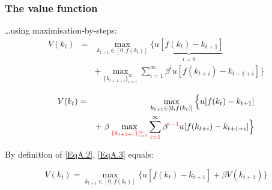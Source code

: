 \documentclass[10pt, handout]{beamer}
\begin{document}
\begin{frame}

\frametitle{The value function}

\ldots using maximisation-by-steps:
 \begin{eqnarray} \nonumber
V(k_t) & = & \max_{ k_{t+1} \in [0,f(k_t)] } \Big\{ \underset{ i = 0}{\underbrace{u[f(k_{t})- k_{t+1}]}}  \\ \nonumber & & +  \max_{\{k_{t+1+i}\}_{i=1}^{\infty}} \sum_{i=1}^{\infty} \beta^{i} u
[f(k_{t+i})- k_{t+1+i}] \Big \}
 \end{eqnarray}


\begin{eqnarray}\nonumber
V(k_t) & = & \max_{ k_{t+1} \in [0,f(k_t)] } \Big\{ u[f(k_{t})- k_{t+1}] \\ \label{EqA.3}  & & + ~ \beta \max_{\color{red}\{k_{t+1+i}\}_{i=1}^{\infty}} \sum_{{\color{red}i=1}}^{\infty} \beta^{{\color{red}i-1}} u
[f(k_{t+i})- k_{t+1+i} ] \Big \}
 \end{eqnarray}

By definition of \eqref{EqA.2}, \eqref{EqA.3} equals:

\begin{equation}\nonumber 
V(k_{t}) = \max_{k_{t+1} \in [0,f(k_t)] } \{ u [f(k_{t})-k_{t+1}] +
\beta V(k_{t+1}) \}
\end{equation}


\end{frame}
\end{document}
